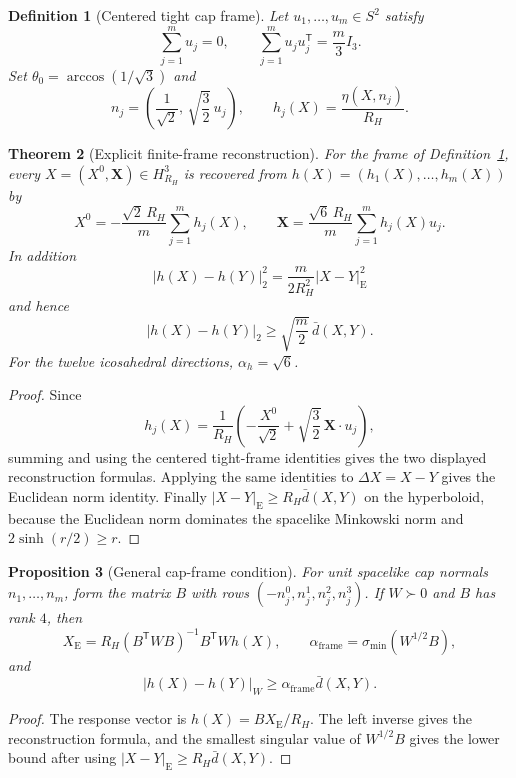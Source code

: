 \documentclass[11pt]{article}
\newtheorem{theorem}{Theorem}[section]
\newtheorem{proposition}[theorem]{Proposition}
\newtheorem{definition}[theorem]{Definition}
\begin{document}
\begin{definition}[Centered tight cap frame]\label{def:centered-tight-cap-frame}
Let \(u_1,\ldots,u_m\in S^2\) satisfy
\[
\sum_{j=1}^m u_j=0,\qquad
\sum_{j=1}^m u_ju_j^{\mathsf T}=\frac m3 I_3.
\]
Set \(\theta_0=\arccos(1/\sqrt3)\) and
\[
n_j=\left(\frac1{\sqrt2},\,\sqrt{\frac32}\,u_j\right),\qquad
h_j(X)=\frac{\eta(X,n_j)}{R_H}.
\]
\end{definition}

\begin{theorem}[Explicit finite-frame reconstruction]\label{thm:h3-finite-conditioned-cap-frame}
For the frame of Definition~\ref{def:centered-tight-cap-frame}, every
\(X=(X^0,\mathbf X)\in H^3_{R_H}\) is recovered from
\(h(X)=(h_1(X),\ldots,h_m(X))\) by
\[
X^0=-\frac{\sqrt2\,R_H}{m}\sum_{j=1}^m h_j(X),\qquad
\mathbf X=\frac{\sqrt6\,R_H}{m}\sum_{j=1}^m h_j(X)u_j.
\]
In addition
\[
|h(X)-h(Y)|_2^2=\frac{m}{2R_H^2}|X-Y|_{\mathrm E}^2
\]
and hence
\[
|h(X)-h(Y)|_2\geq\sqrt{\frac m2}\,\bar d(X,Y).
\]
For the twelve icosahedral directions, \(\alpha_h=\sqrt6\).
\end{theorem}

\begin{proof}
Since
\[
h_j(X)=\frac1{R_H}
\left(-\frac{X^0}{\sqrt2}+\sqrt{\frac32}\,\mathbf X\cdot u_j\right),
\]
summing and using the centered tight-frame identities gives the two displayed
reconstruction formulas. Applying the same identities to
\(\Delta X=X-Y\) gives the Euclidean norm identity. Finally
\(|X-Y|_{\mathrm E}\geq R_H\bar d(X,Y)\) on the hyperboloid, because the
Euclidean norm dominates the spacelike Minkowski norm and
\(2\sinh(r/2)\geq r\).
\end{proof}

\begin{proposition}[General cap-frame condition]\label{prop:h3-general-cap-frame-condition}
For unit spacelike cap normals \(n_1,\ldots,n_m\), form the matrix \(B\) with
rows \((-n_j^0,n_j^1,n_j^2,n_j^3)\). If \(W\succ0\) and \(B\) has rank \(4\),
then
\[
X_{\mathrm E}=R_H(B^{\mathsf T}WB)^{-1}B^{\mathsf T}Wh(X),
\qquad
\alpha_{\mathrm{frame}}=\sigma_{\min}(W^{1/2}B),
\]
and
\[
|h(X)-h(Y)|_W\geq \alpha_{\mathrm{frame}}\bar d(X,Y).
\]
\end{proposition}

\begin{proof}
The response vector is \(h(X)=B X_{\mathrm E}/R_H\). The left inverse gives
the reconstruction formula, and the smallest singular value of \(W^{1/2}B\)
gives the lower bound after using \(|X-Y|_{\mathrm E}\geq R_H\bar d(X,Y)\).
\end{proof}
\end{document}
